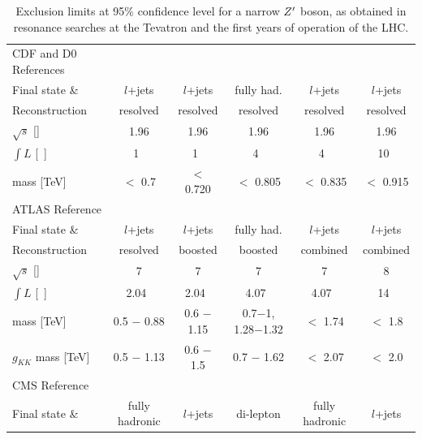 \begin{table}[htpb!]
\begin{center}
\caption{Exclusion limits at 95\% confidence level for a narrow $Z'{}$ boson, as obtained in \ttbar{} resonance searches at the Tevatron and the first years of operation of the LHC.}
\vspace{2mm}
\begin{tabular}{lccccc}
\hline 
CDF and D0 References                        &  ~\cite{Aaltonen:2007ag} & ~\cite{Abazov:2008ny} &  ~\cite{Aaltonen:2011vi} & ~\cite{Abazov:2011gv} & ~\cite{Aaltonen:2012af}\\
Final state   \&                 & $l$+jets & $l$+jets & fully had. & $l$+jets & $l$+jets \\   
Reconstruction                   &  resolved & resolved & resolved & resolved & resolved \\  
$\sqrt{s}$ [\tev{}] & 1.96 &  1.96 &  1.96 & 1.96  & 1.96  \\
$\int{L} $ [~\ifb{}] & 1~\ifb{} & 1~\ifb{} &  4~\ifb{}  &  4~\ifb{} & 10~\ifb{} \\
\Zprime{} mass [TeV]  & $<$ 0.7 & $<$ 0.720 & $<$ 0.805 &   $ < $  0.835 & $ < $ 0.915  \\ \hline
ATLAS Reference                        &     ~\cite{Aad:2012wm}     &  ~\cite{Aad:2012dpa}  &  ~\cite{Aad:2012raa}  & ~\cite{Aad:2013nca}  &  ~\cite{ATLAS-CONF-2013-052} \\
Final state   \&                 & $l$+jets & $l$+jets & fully had. & $l$+jets & $l$+jets \\   
Reconstruction                   & resolved & boosted & boosted & combined & combined \\ 
$\sqrt{s}$ [\tev{}] &  7&  7 & 7  & 7 & 8 \\
$\int{L} $ [~\ifb{}] & 2.04~\ifb{} &   2.04~\ifb{} &  4.07~\ifb{}  &  4.07~\ifb{} & 14~\ifb{} \\
\Zprime{} mass [TeV]  & 0.5 $-$ 0.88 & 0.6 $-$ 1.15 & 0.7$-$1, 1.28$-$1.32  &   $ < $  1.74 & $ < $ 1.8 \\
$g_{KK} $ mass [TeV]  & 0.5 $-$ 1.13 & 0.6 $-$ 1.5  & 0.7 $-$ 1.62 & $<$ 2.07 & $ < $  2.0 \\ \hline 
CMS Reference                        &  ~\cite{Chatrchyan:2012ku}  &  ~\cite{Chatrchyan:2012cx}  & ~\cite{Chatrchyan:2012yca}  &  ~\cite{CMS-PAS-B2G-12-005} & ~\cite{CMS-PAS-B2G-12-006}\\
Final state   \&                 & fully hadronic  & $l$+jets & di-lepton & fully hadronic & $l$+jets\\   

\end{tabular}
\end{center}
\end{table}
